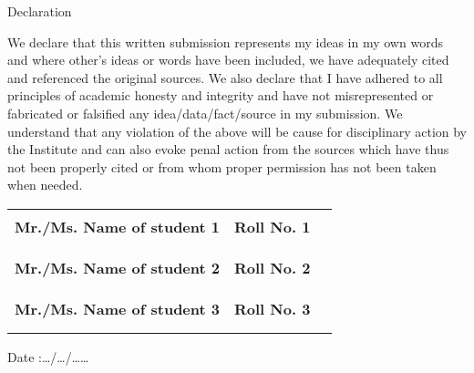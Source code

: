 \begin{center}
\huge Declaration
\end{center}

\vspace{0.5in}

 We declare that this written submission represents my ideas in my own words and where other's ideas or words have been included, we have adequately cited and referenced the original sources. We also declare that I have adhered to all principles of academic honesty and integrity and have not misrepresented or fabricated or falsified any idea/data/fact/source in my submission. We understand that any violation of the above will be cause for disciplinary action by the Institute and can also evoke penal action from the sources which have thus not been properly cited or from whom proper permission has not been taken when needed.

\vspace{2in}
\begin{flushright}
\begin{tabular}{ccc}
   \small{\textbf{Mr./Ms. Name of student 1 }} & \small{\textbf{Roll No. 1}} & \noindent\rule{4cm}{0.5pt}\\\\
   \small{\textbf{Mr./Ms. Name of student 2}} & \small{\textbf{Roll No. 2}} & \noindent\rule{4cm}{0.5pt}\\\\
   \small{\textbf{Mr./Ms. Name of student 3}} & \small{\textbf{Roll No. 3}} & \noindent\rule{4cm}{0.5pt}\\
   \vspace{1in}
    \end{tabular}
\end{flushright}

\begin{flushleft}
  Date :\hspace{0.2cm}\ldots/\ldots/\ldots\ldots
\end{flushleft}
